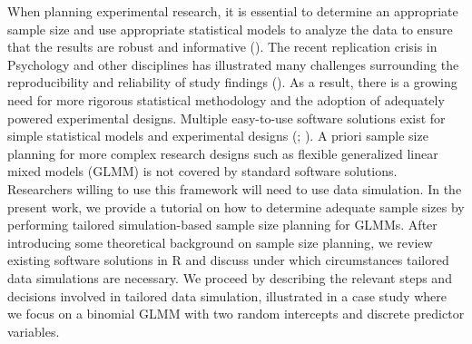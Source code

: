 \documentclass[
  man,
  floatsintext,
  longtable,
  a4paper,
  nolmodern,
  notxfonts,
  notimes,
  colorlinks=true,linkcolor=blue,citecolor=blue,urlcolor=blue]{apa7}
\begin{document}
When planning experimental research, it is essential to determine an
appropriate sample size and use appropriate statistical models to
analyze the data to ensure that the results are robust and informative
(). The
recent replication crisis in Psychology and other disciplines has
illustrated many challenges surrounding the reproducibility and
reliability of study findings
(). As a
result, there is a growing need for more rigorous statistical
methodology and the adoption of adequately powered experimental designs.
Multiple easy-to-use software solutions exist for simple statistical
models and experimental designs (;
). A priori sample size planning for more complex
research designs such as flexible generalized linear mixed models (GLMM)
is not covered by standard software solutions. Researchers willing to
use this framework will need to use data simulation. In the present
work, we provide a tutorial on how to determine adequate sample sizes by
performing tailored simulation-based sample size planning for GLMMs.
After introducing some theoretical background on sample size planning,
we review existing software solutions in R and discuss under which
circumstances tailored data simulations are necessary. We proceed by
describing the relevant steps and decisions involved in tailored data
simulation, illustrated in a case study where we focus on a binomial
GLMM with two random intercepts and discrete predictor variables.
\end{document}
